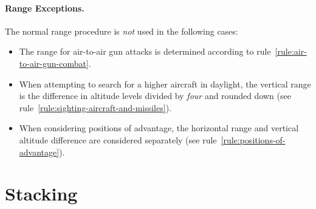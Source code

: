 {\paragraph{Range Exceptions.}
The normal range procedure is \emph{not} used in the following cases:
\begin{itemize}

\item
The range for air-to-air gun attacks is determined according to rule~\ref{rule:air-to-air-gun-combat}.

\item
When attempting to search for a higher aircraft in daylight, the vertical range is the difference in altitude levels divided by \emph{four} and rounded down (see rule~\ref{rule:sighting-aircraft-and-missiles}).

\item
When considering positions of advantage, the horizontal range and vertical altitude difference are considered separately (see rule~\ref{rule:positions-of-advantage}).

\end{itemize}

}

\section{Stacking}



